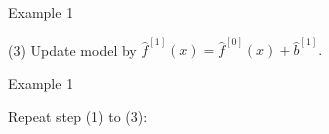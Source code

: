 \documentclass[11pt,compress,t,notes=noshow, xcolor=table]{beamer}
\begin{document}
\begin{vbframe}{Example 1}
\begin{footnotesize}
\vfill

(3) Update model by $\hat{f}^{[1]}(x) = \hat{f}^{[0]}(x) + \hat{b}^{[1]}.$
\end{footnotesize}

\end{vbframe}


\begin{frame}{Example 1}

\footnotesize
Repeat step (1) to (3):

\begin{center}

\end{center}
\end{frame}
\end{document}
